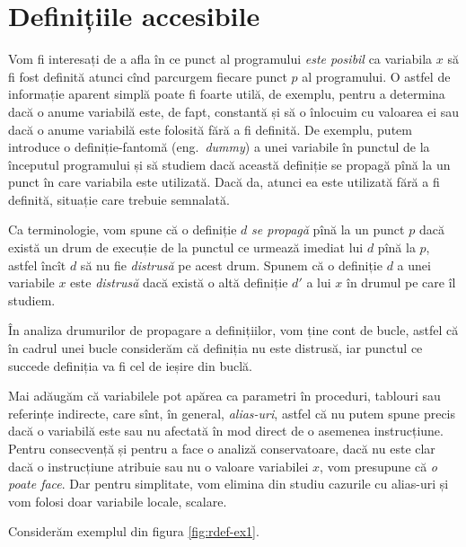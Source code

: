 
\chapter{Definițiile accesibile}

Vom fi interesați de a afla în ce punct al programului \emph{este posibil}
ca variabila $ x $ să fi fost definită atunci cînd parcurgem fiecare
punct $ p $ al programului. O astfel de informație aparent simplă poate fi
foarte utilă, de exemplu, pentru a determina dacă o anume variabilă este,
de fapt, constantă și să o înlocuim cu valoarea ei sau dacă o anume variabilă
este folosită fără a fi definită. De exemplu, putem introduce o
definiție-fantomă (eng.\ \emph{dummy}) a unei variabile în punctul de la
începutul programului și să studiem dacă această definiție se propagă pînă la
un punct în care variabila este utilizată. Dacă da, atunci ea este utilizată
fără a fi definită, situație care trebuie semnalată.

Ca terminologie, vom spune că o definiție $ d $ \emph{se propagă} pînă la
un punct $ p $ dacă există un drum de execuție de la punctul ce urmează imediat
lui $ d $ pînă la $ p $, astfel încît $ d $ să nu fie \emph{distrusă} pe acest
drum. Spunem că o definiție $ d $ a unei variabile $ x $ este \emph{distrusă}
dacă există o altă definiție $ d' $ a lui $ x $ în drumul pe care îl studiem.

\begin{remark}\label{rk:def-loop}
    În analiza drumurilor de propagare a definițiilor, vom ține cont de bucle,
    astfel că în cadrul unei bucle considerăm că definiția nu este distrusă,
    iar punctul ce succede definiția va fi cel de ieșire din buclă.
\end{remark}

Mai adăugăm că variabilele pot apărea ca parametri în proceduri, tablouri
sau referințe indirecte, care sînt, în general, \emph{alias-uri}, astfel că
nu putem spune precis dacă o variabilă este sau nu afectată în mod direct
de o asemenea instrucțiune. Pentru consecvență și pentru a face o analiză
conservatoare, dacă nu este clar dacă o instrucțiune atribuie sau nu o valoare
variabilei $ x $, vom presupune că \emph{o poate face}. Dar pentru simplitate,
vom elimina din studiu cazurile cu alias-uri și vom folosi doar variabile
locale, scalare.

Considerăm exemplul din figura \ref{fig:rdef-ex1}.

